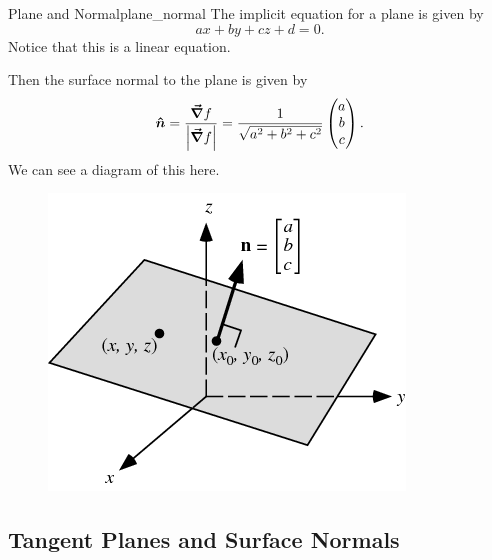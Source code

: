                                         \begin{ex}{Plane and Normal}{plane_normal}
                                        The implicit equation for a plane is given by
                                        \[
                                        ax+by+cz+ d = 0.
                                        \]
                                        Notice that this is a linear equation.

                                        Then the surface normal to the plane is given by
                                        \[
                                        \boldsymbol{\hat{n}} = \frac{\boldsymbol{\vec{\nabla}} f}{\left| \boldsymbol{\vec{\nabla}} f\right|} = \frac{1}{\sqrt{a^2+b^2+c^2}}\begin{pmatrix} a \\ b \\ c\end{pmatrix}.
                                        \]
                                        We can see a diagram of this here.
                                        \begin{figure}[H]
                                            \centering
                                            \includegraphics[width=.4\textwidth]{Figures_Part_6/plane_n.png}
                                        \end{figure}
                                        \end{ex}


                                        \subsection{Tangent Planes and Surface Normals}

